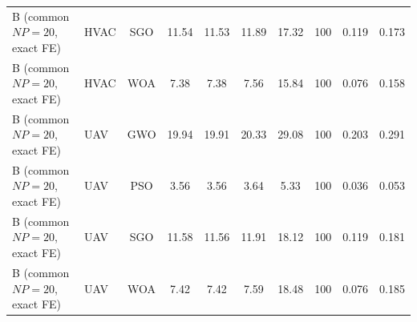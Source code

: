 \begin{table}[htbp]
{\begin{tabular}{@{}llcccccccc@{}}
B (common $NP{=}20$, exact FE) & HVAC & SGO & 11.54 & 11.53 & 11.89 & 17.32 & 100 & 0.119 & 0.173 \\
B (common $NP{=}20$, exact FE) & HVAC & WOA & 7.38 & 7.38 & 7.56 & 15.84 & 100 & 0.076 & 0.158 \\
B (common $NP{=}20$, exact FE) & UAV & GWO & 19.94 & 19.91 & 20.33 & 29.08 & 100 & 0.203 & 0.291 \\
B (common $NP{=}20$, exact FE) & UAV & PSO & 3.56 & 3.56 & 3.64 & 5.33 & 100 & 0.036 & 0.053 \\
B (common $NP{=}20$, exact FE) & UAV & SGO & 11.58 & 11.56 & 11.91 & 18.12 & 100 & 0.119 & 0.181 \\
B (common $NP{=}20$, exact FE) & UAV & WOA & 7.42 & 7.42 & 7.59 & 18.48 & 100 & 0.076 & 0.185 \\
\bottomrule
\end{tabular}}
\end{table}
